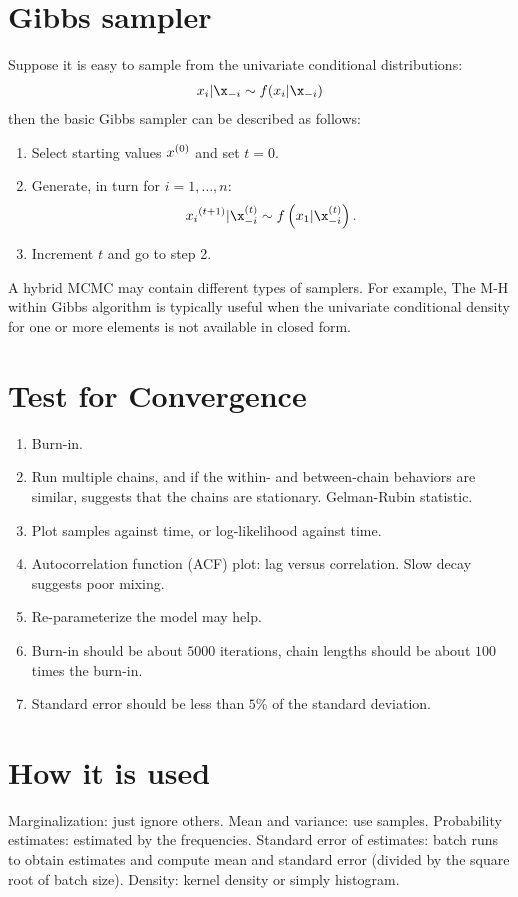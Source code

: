 \documentclass{book}
\begin{document}
\section{Gibbs sampler}
Suppose it is easy to sample from the univariate conditional distributions:
\begin{align}
x_i | \x_{-i} \sim f(x_i | \x_{-i})
\end{align}
then the basic Gibbs sampler can be described as follows:
\begin{enumerate}
\item Select starting values ${x}^{(0)}$ and set $t=0$.
\item Generate, in turn for $i = 1, \dots, n$:
\begin{align}
\dual{x_i}{t+1} | \x_{-i}^{(t)} \sim f\left(x_1 | \x_{-i}^{(t)}\right).
\end{align}
\item Increment $t$ and go to step 2.
\end{enumerate}
A hybrid MCMC may contain different types of samplers. For example, The M-H within Gibbs algorithm is typically useful when the univariate conditional density for one or more elements is not available in closed form.

\section{Test for Convergence}
\begin{enumerate}
\item Burn-in.
\item Run multiple chains, and if the within- and between-chain behaviors are similar, suggests that the chains are stationary. Gelman-Rubin statistic.
\item Plot samples against time, or log-likelihood against time.
\item Autocorrelation function (ACF) plot: lag versus correlation. Slow decay suggests poor mixing.
\item Re-parameterize the model may help.
\item Burn-in should be about $5000$ iterations, chain lengths should be about $100$ times the burn-in.
\item Standard error should be less than $5\%$ of the standard deviation.
\end{enumerate}

\section{How it is used}
Marginalization: just ignore others. Mean and variance: use samples. Probability estimates: estimated by the frequencies. Standard error of estimates: batch runs to obtain estimates and compute mean and standard error (divided by the square root of batch size). Density: kernel density or simply histogram.
\end{document}
